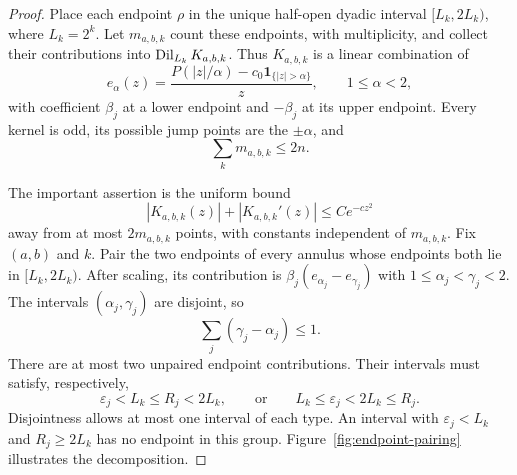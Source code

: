 \begin{proof}
Place each endpoint $\rho$ in the unique half-open dyadic interval
$[L_k,2L_k)$, where $L_k=2^k$.  Let $m_{a,b,k}$ count these endpoints,
with multiplicity, and collect their contributions into
$\operatorname{Dil}_{L_k}K_{a,b,k}$.  Thus $K_{a,b,k}$ is a linear combination of
\begin{equation}
 e_\alpha(z)
 =\frac{P(|z|/\alpha)-c_0\mathbf1_{\{|z|>\alpha\}}}{z},
 \qquad 1\le\alpha<2,
 \label{eq:dimensionless-endpoint}
\end{equation}
with coefficient $\beta_j$ at a lower endpoint and $-\beta_j$ at its
upper endpoint.  Every kernel is odd, its possible jump points are
the $\pm\alpha$, and
\begin{equation}
 \sum_km_{a,b,k}\le2n.
 \label{eq:endpoint-count}
\end{equation}

The important assertion is the uniform bound
\begin{equation}
 |K_{a,b,k}(z)|+|K_{a,b,k}'(z)|\le Ce^{-cz^2}
 \label{eq:paired-endpoint-bound}
\end{equation}
away from at most $2m_{a,b,k}$ points, with constants independent of
$m_{a,b,k}$.  Fix $(a,b)$ and $k$.  Pair the two endpoints of every
annulus whose endpoints both lie in $[L_k,2L_k)$.  After scaling, its
contribution is $\beta_j(e_{\alpha_j}-e_{\gamma_j})$ with
$1\le\alpha_j<\gamma_j<2$.
The intervals $(\alpha_j,\gamma_j)$ are disjoint, so
\begin{equation}
 \sum_j(\gamma_j-\alpha_j)\le1.
 \label{eq:paired-length}
\end{equation}
There are at most two unpaired endpoint contributions.  Their
intervals must satisfy, respectively,
\[
 \varepsilon_j<L_k\le R_j<2L_k,
 \qquad\text{or}\qquad
 L_k\le\varepsilon_j<2L_k\le R_j.
\]
Disjointness allows at most one interval of each type.  An interval
with $\varepsilon_j<L_k$ and $R_j\ge2L_k$ has no endpoint in this
group.  Figure~\ref{fig:endpoint-pairing} illustrates the decomposition.


\end{proof}
